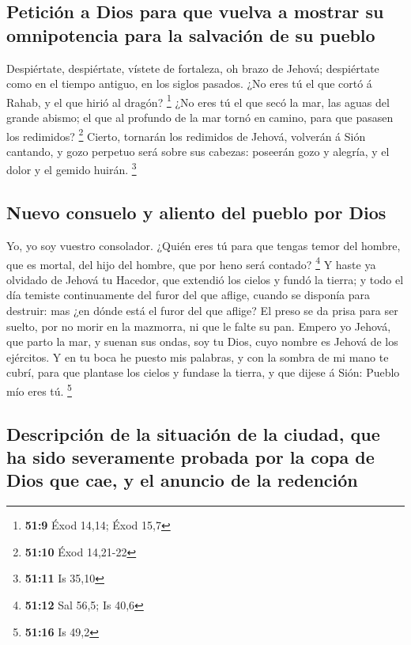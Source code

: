 \hypertarget{peticiuxf3n-a-dios-para-que-vuelva-a-mostrar-su-omnipotencia-para-la-salvaciuxf3n-de-su-pueblo}{%
\subsection{Petición a Dios para que vuelva a mostrar su omnipotencia
para la salvación de su
pueblo}\label{peticiuxf3n-a-dios-para-que-vuelva-a-mostrar-su-omnipotencia-para-la-salvaciuxf3n-de-su-pueblo}}

 Despiértate, despiértate, vístete de fortaleza, oh brazo de
Jehová; despiértate como en el tiempo antiguo, en los siglos pasados.
¿No eres tú el que cortó á Rahab, y el que hirió al dragón? \footnote{\textbf{51:9}
  Éxod 14,14; Éxod 15,7}  ¿No eres tú el que secó la mar,
las aguas del grande abismo; el que al profundo de la mar tornó en
camino, para que pasasen los redimidos? \footnote{\textbf{51:10} Éxod
  14,21-22}  Cierto, tornarán los redimidos de Jehová,
volverán á Sión cantando, y gozo perpetuo será sobre sus cabezas:
poseerán gozo y alegría, y el dolor y el gemido huirán. \footnote{\textbf{51:11}
  Is 35,10}

\hypertarget{nuevo-consuelo-y-aliento-del-pueblo-por-dios}{%
\subsection{Nuevo consuelo y aliento del pueblo por
Dios}\label{nuevo-consuelo-y-aliento-del-pueblo-por-dios}}

 Yo, yo soy vuestro consolador. ¿Quién eres tú para que
tengas temor del hombre, que es mortal, del hijo del hombre, que por
heno será contado? \footnote{\textbf{51:12} Sal 56,5; Is 40,6}
 Y haste ya olvidado de Jehová tu Hacedor, que extendió los
cielos y fundó la tierra; y todo el día temiste continuamente del furor
del que aflige, cuando se disponía para destruir: mas ¿en dónde está el
furor del que aflige?  El preso se da prisa para ser
suelto, por no morir en la mazmorra, ni que le falte su pan.
 Empero yo Jehová, que parto la mar, y suenan sus ondas,
soy tu Dios, cuyo nombre es Jehová de los ejércitos.  Y en
tu boca he puesto mis palabras, y con la sombra de mi mano te cubrí,
para que plantase los cielos y fundase la tierra, y que dijese á Sión:
Pueblo mío eres tú. \footnote{\textbf{51:16} Is 49,2}

\hypertarget{descripciuxf3n-de-la-situaciuxf3n-de-la-ciudad-que-ha-sido-severamente-probada-por-la-copa-de-dios-que-cae-y-el-anuncio-de-la-redenciuxf3n}{%
\subsection{Descripción de la situación de la ciudad, que ha sido
severamente probada por la copa de Dios que cae, y el anuncio de la
redención}\label{descripciuxf3n-de-la-situaciuxf3n-de-la-ciudad-que-ha-sido-severamente-probada-por-la-copa-de-dios-que-cae-y-el-anuncio-de-la-redenciuxf3n}}

